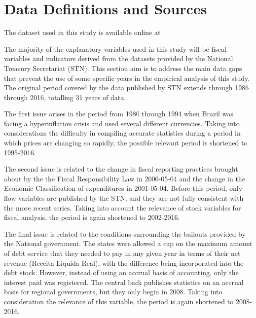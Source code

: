 \appendix
\chapter{Data Definitions and Sources}
\label{appendix:data-source}

The dataset used in this study is available online at 

The majority of the explanatory variables used in this study will be fiscal variables and indicators derived from the datasets provided by the National Treasury Secretariat (STN). This section aim is to address the main data gaps that prevent the use of some specific years in the empirical analysis of this study. The original period covered by the data published by STN extends through 1986 through 2016, totalling 31 years of data. 

The first issue arises in the period from 1980 through 1994 when Brazil was facing a hyperinflation crisis and used several different currencies. Taking into considerations the difficulty in compiling accurate statistics during a period in which prices are changing so rapidly, the possible relevant period is shortened to 1995-2016. 

The second issue is related to the change in fiscal reporting practices brought about by the the Fiscal Responsibility Law in 2000-05-04 and the change in the Economic Classification of expenditures in 2001-05-04. Before this period, only flow variables are published by the STN, and they are not fully consistent with the more recent series. Taking into account the relevance of stock variables for fiscal analysis, the period is again shortened to 2002-2016.

The final issue is related to the conditions surrounding the bailouts provided by the National government. The states were allowed a cap on the maximum amount of debt service that they needed to pay in any given year in terms of their net revenue (Receita Liquida Real), with the difference being incorporated into the debt stock. However, instead of using an accrual basis of accounting, only the interest paid was registered. The central back publishes statistics on an accrual basis for regional governments, but they only begin in 2008. Taking into consideration the relevance of this variable, the period is again shortened to 2008-2016.

